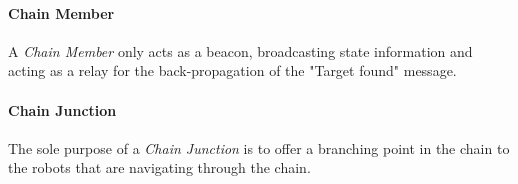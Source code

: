 \paragraph{Chain Member}
A \emph{Chain Member} only acts as a beacon, broadcasting state information and acting as a relay for the back-propagation of the "Target found" message.

\paragraph{Chain Junction}
The sole purpose of a \emph{Chain Junction} is to offer a branching point in the chain to the robots that are navigating through the chain.

